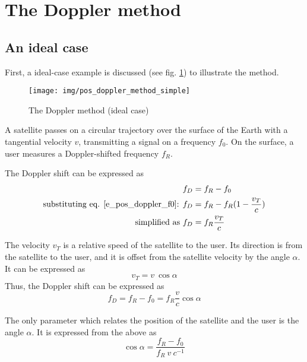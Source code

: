 \section{The Doppler method}
\label{s_pos_doppler_method}
 

\subsection{An ideal case}
First, a ideal-case example is discussed (see fig. \ref{f_pos_doppler_method_simple}) to illustrate the method.

\begin{figure}
    \centering
    \texttt{[image: img/pos\_doppler\_method\_simple]}
    \caption{The Doppler method (ideal case)}
    \label{f_pos_doppler_method_simple}
\end{figure}

A satellite passes on a circular trajectory over the surface of the Earth with a tangential velocity $v$, transmitting a signal on a frequency $f_0$. On the surface, a user measures a Doppler-shifted frequency $f_R$.

The Doppler shift can be expressed as
\begin{align}
    f_D &= f_R - f_0 \\
    \textnormal{substituting eq. \ref{e_pos_doppler_f0}: } 
    f_D &= f_R - f_R (1 - \frac{v_T}{c}) \\
    \textnormal{simplified as } 
    f_D &= f_R \frac{v_T}{c} \label{e_pos_dopp_shift}
\end{align}

The velocity $v_T$ is a relative speed of the satellite to the user. Its direction is from the satellite to the user, and it is offset from the satellite velocity by the angle $\alpha$. It can be expressed as
\begin{equation*}
    v_T = v \ \cos{\alpha}
\end{equation*}
Thus, the Doppler shift can be expressed as
\begin{equation}
    \label{e_pos_fd}
    f_D = f_R - f_0 = f_R \frac{v}{c} \cos{\alpha}
\end{equation}

The only parameter which relates the position of the satellite and the user is the angle $\alpha$. It is expressed from the above as
\begin{equation}
    \label{e_pos_cos_alpha}
    \cos{\alpha} = \frac{f_R - f_0}{f_R \ v \ c^{-1}}
\end{equation}

